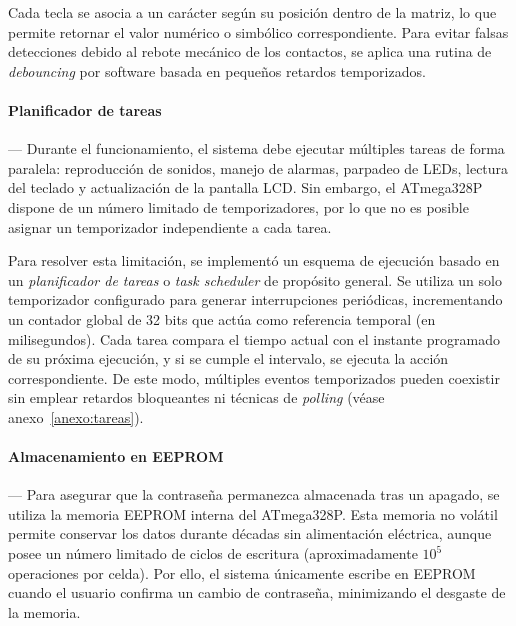     \vspace{1em}

    Cada tecla se asocia a un carácter según su posición dentro de la matriz, lo que permite retornar el valor numérico o simbólico correspondiente. Para evitar falsas detecciones debido al rebote mecánico de los contactos, se aplica una rutina de \textit{debouncing} por software basada en pequeños retardos temporizados.

    \vspace{1em}

    \paragraph*{\textbf{Planificador de tareas}}---
    Durante el funcionamiento, el sistema debe ejecutar múltiples tareas de forma paralela: reproducción de sonidos, manejo de alarmas, parpadeo de LEDs, lectura del teclado y actualización de la pantalla LCD. Sin embargo, el ATmega328P dispone de un número limitado de temporizadores, por lo que no es posible asignar un temporizador independiente a cada tarea.

    \vspace{1em}

    Para resolver esta limitación, se implementó un esquema de ejecución basado en un \textit{planificador de tareas} o \textit{task scheduler} de propósito general. Se utiliza un solo temporizador configurado para generar interrupciones periódicas, incrementando un contador global de 32 bits que actúa como referencia temporal (en milisegundos). Cada tarea compara el tiempo actual con el instante programado de su próxima ejecución, y si se cumple el intervalo, se ejecuta la acción correspondiente. De este modo, múltiples eventos temporizados pueden coexistir sin emplear retardos bloqueantes ni técnicas de \textit{polling} (véase anexo~\ref{anexo:tareas}).

    \vspace{1em}

    \paragraph*{\textbf{Almacenamiento en EEPROM}}---
    Para asegurar que la contraseña permanezca almacenada tras un apagado, se utiliza la memoria EEPROM interna del ATmega328P. Esta memoria no volátil permite conservar los datos durante décadas sin alimentación eléctrica, aunque posee un número limitado de ciclos de escritura (aproximadamente $10^5$ operaciones por celda). Por ello, el sistema únicamente escribe en EEPROM cuando el usuario confirma un cambio de contraseña, minimizando el desgaste de la memoria.

